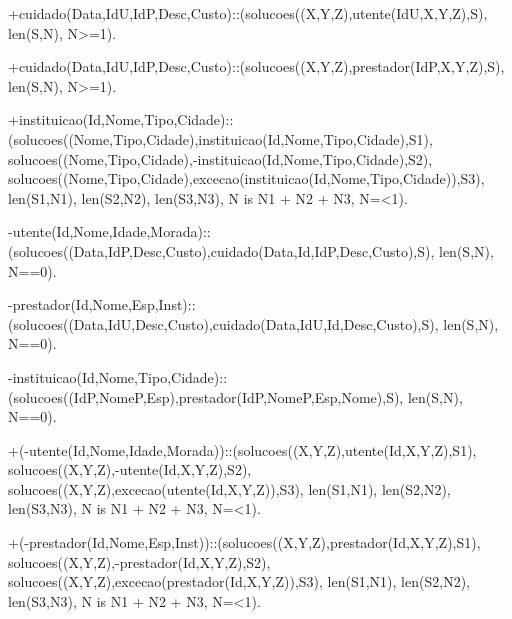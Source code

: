 \documentclass{article}
\begin{document}
\begin{spverbatim}
+cuidado(Data,IdU,IdP,Desc,Custo)::(solucoes((X,Y,Z),utente(IdU,X,Y,Z),S),
                                    len(S,N),
                                    N>=1).

+cuidado(Data,IdU,IdP,Desc,Custo)::(solucoes((X,Y,Z),prestador(IdP,X,Y,Z),S),
                                    len(S,N),
                                    N>=1).

+instituicao(Id,Nome,Tipo,Cidade)::
		(solucoes((Nome,Tipo,Cidade),instituicao(Id,Nome,Tipo,Cidade),S1),
        solucoes((Nome,Tipo,Cidade),-instituicao(Id,Nome,Tipo,Cidade),S2),
        solucoes((Nome,Tipo,Cidade),excecao(instituicao(Id,Nome,Tipo,Cidade)),S3),
        len(S1,N1),
        len(S2,N2),
        len(S3,N3),
        N is N1 + N2 + N3,
        N=<1).

-utente(Id,Nome,Idade,Morada)::
                      (solucoes((Data,IdP,Desc,Custo),cuidado(Data,Id,IdP,Desc,Custo),S),
                      len(S,N),
                      N==0).

-prestador(Id,Nome,Esp,Inst)::(solucoes((Data,IdU,Desc,Custo),cuidado(Data,IdU,Id,Desc,Custo),S),
                                len(S,N),
                                N==0).

-instituicao(Id,Nome,Tipo,Cidade)::(solucoes((IdP,NomeP,Esp),prestador(IdP,NomeP,Esp,Nome),S),
                                    len(S,N),
                                    N==0).

+(-utente(Id,Nome,Idade,Morada))::(solucoes((X,Y,Z),utente(Id,X,Y,Z),S1),
                                solucoes((X,Y,Z),-utente(Id,X,Y,Z),S2),
                                solucoes((X,Y,Z),excecao(utente(Id,X,Y,Z)),S3),
                                len(S1,N1),
                                len(S2,N2),
                                len(S3,N3),
                                N is N1 + N2 + N3,
                                N=<1).

+(-prestador(Id,Nome,Esp,Inst))::(solucoes((X,Y,Z),prestador(Id,X,Y,Z),S1),
                               solucoes((X,Y,Z),-prestador(Id,X,Y,Z),S2),
                               solucoes((X,Y,Z),excecao(prestador(Id,X,Y,Z)),S3),
                               len(S1,N1),
                               len(S2,N2),
                               len(S3,N3),
                               N is N1 + N2 + N3,
                               N=<1).


\end{spverbatim}
\end{document}
